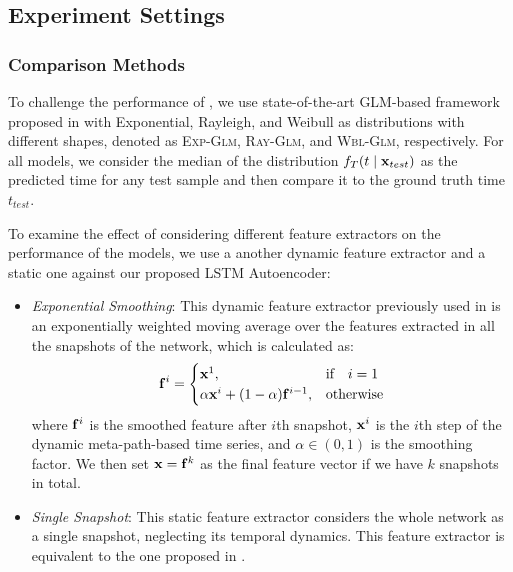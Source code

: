 \subsection{Experiment Settings}
\subsubsection{Comparison Methods}
To challenge the performance of \npglm, we use state-of-the-art GLM-based framework proposed in \cite{sun2012will} with Exponential, Rayleigh, and Weibull as distributions with different shapes, denoted as \textsc{Exp-Glm}, \textsc{Ray-Glm}, and \textsc{Wbl-Glm}, respectively. For all models, we consider the median of the distribution $f_T(t\mid\mathbf{x}_{test})$ as the predicted time for any test sample and then compare it to the ground truth time $t_{test}$.

{\color{red}To examine the effect of considering different feature extractors on the performance of the models, we use a another dynamic feature extractor and a static one against our proposed LSTM Autoencoder:
\begin{itemize}
\item \emph{Exponential Smoothing}: This dynamic feature extractor previously used in \cite{hajibagheri2016leveraging} is an exponentially weighted moving average over the features extracted in all the snapshots of the network, which is calculated as:
\[\mathbf{f}^i=\begin{cases} 
\mathbf{x}^1, & \text{if}\quad i=1 \\
\alpha\mathbf{x}^i+(1-\alpha)\mathbf{f}^{i-1}, & \text{otherwise}
\end{cases}\]
where $\mathbf{f}^i$ is the smoothed feature after $i$th snapshot, $\mathbf{x}^i$ is the $i$th step of the dynamic meta-path-based time series, and $\alpha\in(0,1)$ is the smoothing factor. We then set $\mathbf{x}=\mathbf{f}^k$ as the final feature vector if we have $k$ snapshots in total.
\item \emph{Single Snapshot}: This static feature extractor considers the whole network as a single snapshot, neglecting its temporal dynamics. This feature extractor is equivalent to the one proposed in \cite{sun2012will}.
\end{itemize}}

